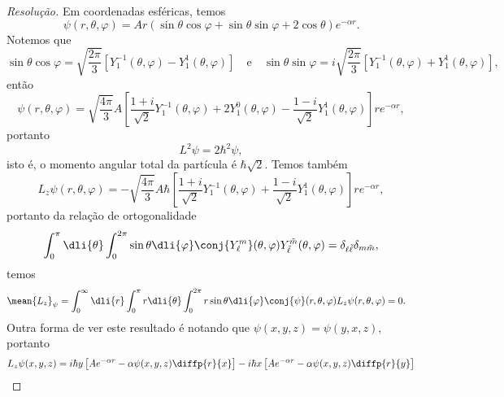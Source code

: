 \begin{proof}[Resolução]
    Em coordenadas esféricas, temos
    \begin{equation*}
        \psi(r, \theta, \varphi) = Ar ( \sin\theta \cos\varphi + \sin \theta\sin\varphi  + 2\cos\theta) e^{-\alpha r}.
    \end{equation*}
    Notemos que
    \begin{equation*}
        \sin\theta \cos\varphi = \sqrt{\frac{2\pi}{3}} \left[Y_{1}^{-1}(\theta, \varphi) - Y_{1}^{1}(\theta, \varphi)\right] \quad\text{e}\quad
        \sin\theta \sin\varphi = i\sqrt{\frac{2\pi}{3}} \left[Y_{1}^{-1}(\theta, \varphi) + Y_{1}^{1}(\theta, \varphi)\right],
    \end{equation*}
    então
    \begin{equation*}
        \psi(r, \theta,\varphi) = \sqrt{\frac{4\pi}{3}}A\left[\frac{1 + i}{\sqrt{2}}Y_{1}^{-1}(\theta,\varphi) + 2Y_{1}^{0}(\theta, \varphi)- \frac{1 - i}{\sqrt{2}}Y_{1}^{1}(\theta,\varphi) \right]re^{-\alpha r},
    \end{equation*}
    portanto
    \begin{equation*}
        L^2\psi = 2\hbar^2 \psi,
    \end{equation*}
    isto é, o momento angular total da partícula é \(\hbar\sqrt{2}\). Temos também
    \begin{equation*}
        L_z \psi(r,\theta,\varphi) = -\sqrt{\frac{4\pi}{3}}A\hbar \left[\frac{1 + i}{\sqrt{2}}Y_{1}^{-1}(\theta,\varphi) + \frac{1 - i}{\sqrt{2}}Y_{1}^{1}(\theta,\varphi)\right]r e^{-\alpha r},
    \end{equation*}
    portanto da relação de ortogonalidade
    \begin{equation*}
        \int_0^{\pi}\dli{\theta} \int_0^{2\pi}\sin\theta \dli{\varphi} \conj{Y_{\ell}^m}(\theta, \varphi) Y_{\tilde{\ell}}^{\tilde{m}}(\theta,\varphi) = \delta_{\ell \tilde{\ell}} \delta_{m \tilde{m}},
    \end{equation*}
    temos
    \begin{align*}
        \mean{L_z}_\psi &= \int_{0}^\infty \dli{r}\int_0^{\pi} r \dli{\theta} \int_0^{2\pi} r\sin\theta \dli{\varphi} \conj{\psi}(r,\theta,\varphi) L_z \psi(r,\theta,\varphi) = 0.
    \end{align*}
    Outra forma de ver este resultado é notando que \(\psi(x,y,z) = \psi(y,x,z)\), portanto
    \begin{align*}
        L_z \psi(x,y,z) %
                        = i\hbar y\left[Ae^{-\alpha r} - \alpha \psi(x,y,z) \diffp{r}{x}\right]-i\hbar x\left[Ae^{-\alpha r} - \alpha \psi(x,y,z) \diffp{r}{y}\right]

\end{align*}
\end{proof}
